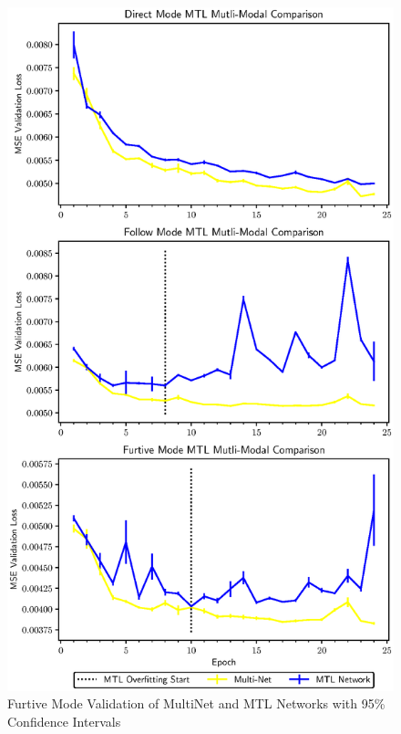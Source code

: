 \begin{figure}[t]
\centering
\includegraphics[width=\linewidth]{paper/content/images/individual_new}
\caption{Furtive Mode Validation of MultiNet and MTL Networks with 95\% Confidence Intervals}

\label{fig:furtivegraph}
\end{figure}


